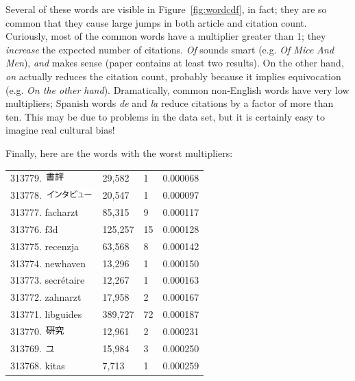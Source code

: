 \documentclass[twocolumn]{article}
\begin{document}
Several of these words are visible in Figure~\ref{fig:wordcdf}, in
fact; they are so common that they cause large jumps in both article
and citation count. Curiously, most of the common words have a
multiplier greater than 1; they {\em increase} the expected number of
citations. {\em Of} sounds smart (e.g. {\em Of Mice And Men}), {\em
  and} makes sense (paper contains at least two results). On the other
hand, {\em on} actually reduces the citation count, probably because
it implies equivocation (e.g. {\em On the other hand}). Dramatically,
common non-English words have very low multipliers; Spanish words {\em
  de} and {\em la} reduce citations by a factor of more than ten. This
may be due to problems in the data set, but it is certainly easy to
imagine real cultural bias!

Finally, here are the words with the worst multipliers:
\begin{tabular}{l|l|l|l}
313779.  \includegraphics[width=2em]{bookreview} & 29,582 & 1 & 0.000068 \\
313778.  \includegraphics[width=5em]{interview} & 20,547 & 1 & 0.000097 \\
313777.  facharzt & 85,315 & 9 & 0.000117 \\
313776.  f3d & 125,257 & 15 & 0.000128 \\
313775.  recenzja & 63,568 & 8 & 0.000142 \\
313774.  newhaven & 13,296 & 1 & 0.000150 \\
313773.  secr\'etaire & 12,267 & 1 & 0.000163 \\
313772.  zahnarzt & 17,958 & 2 & 0.000167 \\
313771.  libguides & 389,727 & 72 & 0.000187 \\
313770.  \includegraphics[width=2em]{research} & 12,961 & 2 & 0.000231 \\
313769.  \includegraphics[width=1em]{that} & 15,984 & 3 & 0.000250 \\
313768.  kitas & 7,713 & 1 & 0.000259 \\
\end{tabular}
\end{document}
